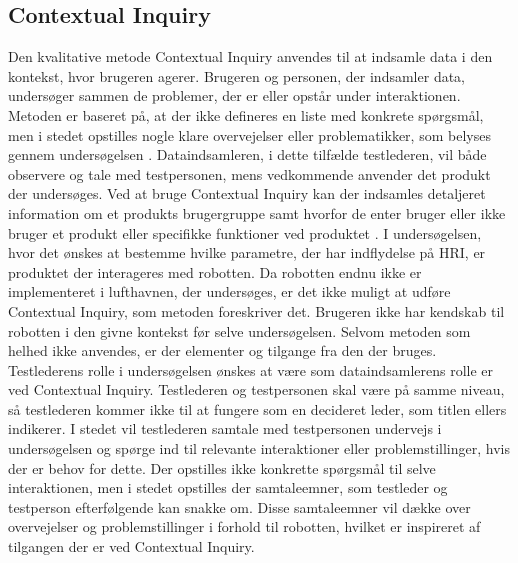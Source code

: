 \subsection{Contextual Inquiry}
\label{ParametreContextualInquiry}
%
Den kvalitative metode Contextual Inquiry anvendes til at indsamle data i den kontekst, hvor brugeren agerer. Brugeren og personen, der indsamler data, undersøger sammen de problemer, der er eller opstår under interaktionen. Metoden er baseret på, at der ikke defineres en liste med konkrete spørgsmål, men i stedet opstilles nogle klare overvejelser eller problematikker, som belyses gennem undersøgelsen \textcite[s. 1]{PDF:UsingCIToLearn}. Dataindsamleren, i dette tilfælde testlederen, vil både observere og tale med testpersonen, mens vedkommende anvender det produkt der undersøges. \blankline
%
Ved at bruge Contextual Inquiry kan der indsamles detaljeret information om et produkts brugergruppe samt hvorfor de enter bruger eller ikke bruger et produkt eller specifikke funktioner ved produktet \textcite[s. 2]{PDF:UsingCIToLearn}. \blankline
%
I undersøgelsen, hvor det ønskes at bestemme hvilke parametre, der har indflydelse på HRI, er produktet der interageres med robotten. Da robotten endnu ikke er implementeret i lufthavnen, der undersøges, er det ikke muligt at udføre Contextual Inquiry, som metoden foreskriver det. Brugeren ikke har kendskab til robotten i den givne kontekst før selve undersøgelsen. Selvom metoden som helhed ikke anvendes, er der elementer og tilgange fra den der bruges. \blankline
%
Testlederens rolle i undersøgelsen ønskes at være som dataindsamlerens rolle er ved Contextual Inquiry. Testlederen og testpersonen skal være på samme niveau, så testlederen kommer ikke til at fungere som en decideret leder, som titlen ellers indikerer. I stedet vil testlederen samtale med testpersonen undervejs i undersøgelsen og spørge ind til relevante interaktioner eller problemstillinger, hvis der er behov for dette. Der opstilles ikke konkrette spørgsmål til selve interaktionen, men i stedet opstilles der samtaleemner, som testleder og testperson efterfølgende kan snakke om. Disse samtaleemner vil dække over overvejelser og problemstillinger i forhold til robotten, hvilket er inspireret af tilgangen der er ved Contextual Inquiry. \blankline
%
